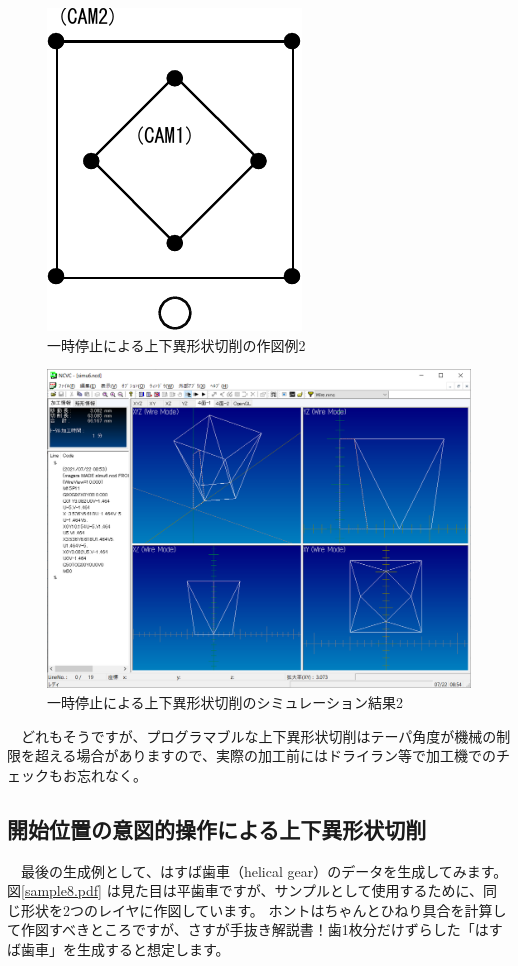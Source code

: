 \begin{figure}[H]
\centering
\includegraphics{No2/fig/sample7-crop.pdf}
\caption{一時停止による上下異形状切削の作図例2}
\label{fig:sample7.pdf}
\end{figure}

\begin{figure}[H]
\centering
\includegraphics[scale=0.5]{No2/fig/simu6.png}
\caption{一時停止による上下異形状切削のシミュレーション結果2}
\label{fig:simu6.png}
\end{figure}

　どれもそうですが、プログラマブルな上下異形状切削はテーパ角度が機械の制限を超える場合がありますので、実際の加工前にはドライラン等で加工機でのチェックもお忘れなく。

\subsection{開始位置の意図的操作による上下異形状切削}
　最後の生成例として、はすば歯車（helical gear）のデータを生成してみます。
図\ref{sample8.pdf} は見た目は平歯車ですが、サンプルとして使用するために、同じ形状を2つのレイヤに作図しています。
ホントはちゃんとひねり具合を計算して作図すべきところですが、さすが手抜き解説書！歯1枚分だけずらした「はすば歯車」を生成すると想定します。

